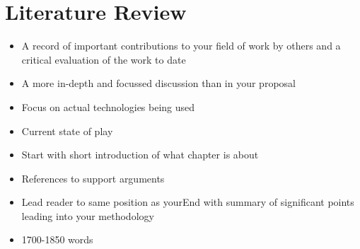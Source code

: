 \section{Literature Review}

\begin{itemize}
    \item A record of important contributions to your field of work by others and a critical evaluation of the work to date
    \item A more in-depth and focussed discussion than in your proposal
    \item Focus on actual technologies being used
    \item Current state of play
    \item Start with short introduction of what chapter is about
    \item References to support arguments
    \item Lead reader to same position as yourEnd with summary of significant points leading into your methodology
    \item 1700-1850 words
\end{itemize}